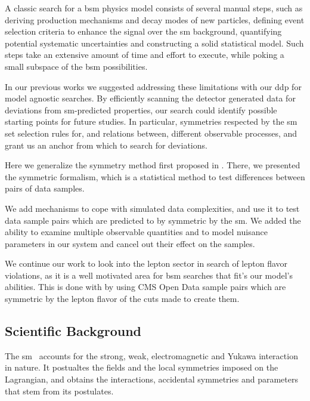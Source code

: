 \documentclass[thesis/Elad_Kliger_Thesis.tex]{subfiles}
\begin{document}
A classic search for a \gls{bsm} physics model \cite{ATLAS_Higgs_2012} consists of several manual steps, such as deriving production mechanisms and decay modes of new particles, defining event selection criteria to enhance the signal over the \gls{sm} background, quantifying potential systematic uncertainties and constructing a solid statistical model. Such steps take an extensive amount of time and effort to execute, while poking a small subspace of the \gls{bsm} possibilities.

In our previous works \cite{Volkovich_2022_DDP, Birman_2022_Symmetries, LastDDPPaper} we suggested addressing these limitations with our \gls{ddp} for model agnostic searches. By efficiently scanning the detector generated data for deviations from \gls{sm}-predicted properties, our search could identify possible starting points for future studies. In particular, symmetries respected by the \gls{sm} set selection rules for, and relations between, different observable processes, and grant us an anchor from which to search for deviations. 

Here we generalize the symmetry method first proposed in \cite{LastDDPPaper}. There, we presented the symmetric formalism, which is a statistical method to test differences between pairs of data samples.

We add mechanisms to cope with simulated data complexities, and use it to test data sample pairs which are predicted to by symmetric by the \gls{sm}. We added the ability to examine multiple observable quantities and to model nuisance parameters in our system and cancel out their effect on the samples.

We continue our work to look into the lepton sector in search of lepton flavor violations, as it is a well motivated area for \gls{bsm} searches that fit's our model's abilities. This is done with by using CMS Open Data sample pairs which are symmetric by the lepton flavor of the cuts made to create them.

\subsection{Scientific Background}

The \gls{sm}~\cite{Grossman_StandardModel_2023} accounts for the strong, weak, electromagnetic and Yukawa interaction in nature. It postualtes the fields and the local symmetries imposed on the Lagrangian, and obtains the interactions, accidental symmetries and parameters that stem from its postulates.
\end{document}
